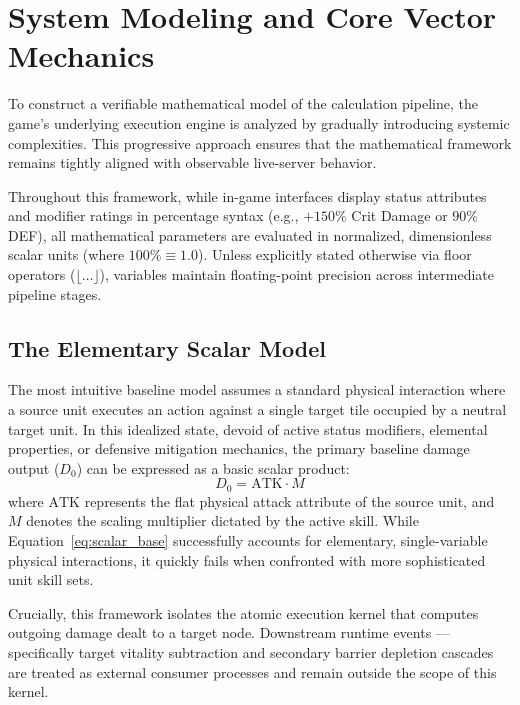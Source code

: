 \documentclass[twocolumn,10pt]{article}
\begin{document}
\clearpage
\section{System Modeling and Core Vector Mechanics}

\label{sec:derivation}

To construct a verifiable mathematical model of the calculation pipeline, the game's underlying execution engine is analyzed by gradually introducing systemic complexities. This progressive approach ensures that the mathematical framework remains tightly aligned with observable live-server behavior.

Throughout this framework, while in-game interfaces display status attributes and modifier ratings in percentage syntax (e.g., $+150\%$ Crit Damage or $90\%$ DEF), all mathematical parameters are evaluated in normalized, dimensionless scalar units (where $100\% \equiv 1.0$). Unless explicitly stated otherwise via floor operators ($\lfloor \dots \rfloor$), variables maintain floating-point precision across intermediate pipeline stages.

\subsection{The Elementary Scalar Model}
The most intuitive baseline model assumes a standard physical interaction where a source unit executes an action against a single target tile occupied by a neutral target unit. In this idealized state, devoid of active status modifiers, elemental properties, or defensive mitigation mechanics, the primary baseline damage output ($D_0$) can be expressed as a basic scalar product:
\begin{equation}
D_0 = \text{ATK} \cdot M
\label{eq:scalar_base}
\end{equation}
where $\text{ATK}$ represents the flat physical attack attribute of the source unit, and $M$ denotes the scaling multiplier dictated by the active skill. While Equation~\ref{eq:scalar_base} successfully accounts for elementary, single-variable physical interactions, it quickly fails when confronted with more sophisticated unit skill sets.

Crucially, this framework isolates the atomic execution kernel that computes outgoing damage dealt to a target node. Downstream runtime events — specifically target vitality subtraction and secondary barrier depletion cascades are treated as external consumer processes and remain outside the scope of this kernel.
\end{document}
